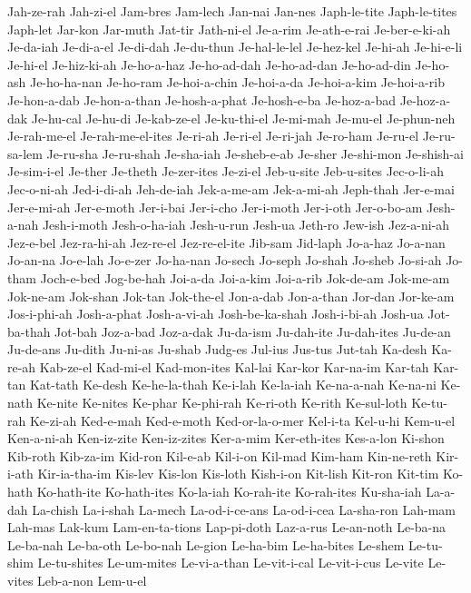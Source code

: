 {  Jah-ze-rah Jah-zi-el Jam-bres Jam-lech Jan-nai Jan-nes
  Japh-le-tite Japh-le-tites Japh-let Jar-kon Jar-muth Jat-tir
  Jath-ni-el Je-a-rim Je-ath-e-rai Je-ber-e-ki-ah Je-da-iah Je-di-a-el
  Je-di-dah Je-du-thun Je-hal-le-lel Je-hez-kel Je-hi-ah Je-hi-e-li
  Je-hi-el Je-hiz-ki-ah Je-ho-a-haz Je-ho-ad-dah Je-ho-ad-dan Je-ho-ad-din
  Je-ho-ash Je-ho-ha-nan Je-ho-ram Je-hoi-a-chin Je-hoi-a-da Je-hoi-a-kim
  Je-hoi-a-rib Je-hon-a-dab Je-hon-a-than Je-hosh-a-phat Je-hosh-e-ba Je-hoz-a-bad
  Je-hoz-a-dak Je-hu-cal Je-hu-di Je-kab-ze-el Je-ku-thi-el Je-mi-mah
  Je-mu-el Je-phun-neh Je-rah-me-el Je-rah-me-el-ites Je-ri-ah Je-ri-el
  Je-ri-jah Je-ro-ham Je-ru-el Je-ru-sa-lem Je-ru-sha Je-ru-shah
  Je-sha-iah Je-sheb-e-ab Je-sher Je-shi-mon Je-shish-ai Je-sim-i-el
  Je-ther Je-theth Je-zer-ites Je-zi-el Jeb-u-site Jeb-u-sites
  Jec-o-li-ah Jec-o-ni-ah Jed-i-di-ah Jeh-de-iah Jek-a-me-am Jek-a-mi-ah
  Jeph-thah Jer-e-mai Jer-e-mi-ah Jer-e-moth Jer-i-bai Jer-i-cho
  Jer-i-moth Jer-i-oth Jer-o-bo-am Jesh-a-nah Jesh-i-moth Jesh-o-ha-iah
  Jesh-u-run Jesh-ua Jeth-ro Jew-ish Jez-a-ni-ah Jez-e-bel
  Jez-ra-hi-ah Jez-re-el Jez-re-el-ite Jib-sam Jid-laph Jo-a-haz
  Jo-a-nan Jo-an-na Jo-e-lah Jo-e-zer Jo-ha-nan Jo-sech
  Jo-seph Jo-shah Jo-sheb Jo-si-ah Jo-tham Joch-e-bed
  Jog-be-hah Joi-a-da Joi-a-kim Joi-a-rib Jok-de-am Jok-me-am
  Jok-ne-am Jok-shan Jok-tan Jok-the-el Jon-a-dab Jon-a-than
  Jor-dan Jor-ke-am Jos-i-phi-ah Josh-a-phat Josh-a-vi-ah Josh-be-ka-shah
  Josh-i-bi-ah Josh-ua Jot-ba-thah Jot-bah Joz-a-bad Joz-a-dak
  Ju-da-ism Ju-dah-ite Ju-dah-ites Ju-de-an Ju-de-ans Ju-dith
  Ju-ni-as Ju-shab Judg-es Jul-ius Jus-tus Jut-tah
  Ka-desh Ka-re-ah Kab-ze-el Kad-mi-el Kad-mon-ites Kal-lai
  Kar-kor Kar-na-im Kar-tah Kar-tan Kat-tath Ke-desh
  Ke-he-la-thah Ke-i-lah Ke-la-iah Ke-na-a-nah Ke-na-ni Ke-nath
  Ke-nite Ke-nites Ke-phar Ke-phi-rah Ke-ri-oth Ke-rith
  Ke-sul-loth Ke-tu-rah Ke-zi-ah Ked-e-mah Ked-e-moth Ked-or-la-o-mer
  Kel-i-ta Kel-u-hi Kem-u-el Ken-a-ni-ah Ken-iz-zite Ken-iz-zites
  Ker-a-mim Ker-eth-ites Kes-a-lon Ki-shon Kib-roth Kib-za-im
  Kid-ron Kil-e-ab Kil-i-on Kil-mad Kim-ham Kin-ne-reth
  Kir-i-ath Kir-ia-tha-im Kis-lev Kis-lon Kis-loth Kish-i-on
  Kit-lish Kit-ron Kit-tim Ko-hath Ko-hath-ite Ko-hath-ites
  Ko-la-iah Ko-rah-ite Ko-rah-ites Ku-sha-iah La-a-dah La-chish
  La-i-shah La-mech La-od-i-ce-ans La-od-i-cea La-sha-ron Lah-mam
  Lah-mas Lak-kum Lam-en-ta-tions Lap-pi-doth Laz-a-rus Le-an-noth
  Le-ba-na Le-ba-nah Le-ba-oth Le-bo-nah Le-gion Le-ha-bim
  Le-ha-bites Le-shem Le-tu-shim Le-tu-shites Le-um-mites Le-vi-a-than
  Le-vit-i-cal Le-vit-i-cus Le-vite Le-vites Leb-a-non Lem-u-el
}
